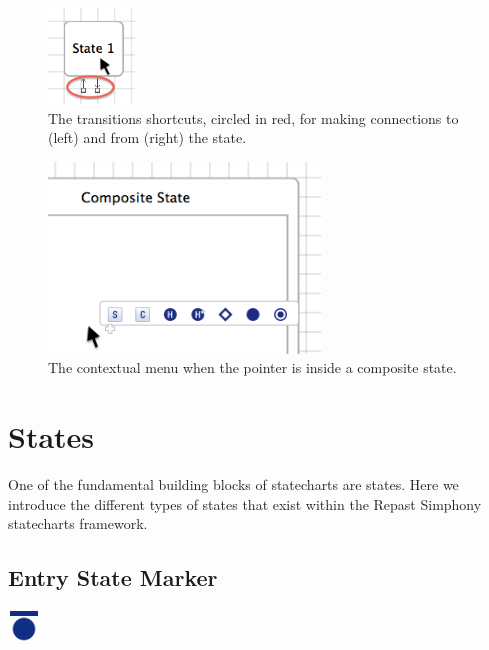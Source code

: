 \documentclass[11pt]{amsart}
\begin{document}
\begin{figure}
\begin{center}
\vspace{.2in}
\centerline {
\includegraphics[height=1in]{StatechartsImages/StateConnectorsHover.png}
}
\caption{The transitions shortcuts, circled in red, for making connections to (left) and from (right) the state.}
\label{fig:stateConnectorsHover}
\end{center}
\end{figure}
\begin{figure}
\begin{center}
\vspace{.2in}
\centerline {
\includegraphics[height=2in]{StatechartsImages/CompositeContextualMenu.png}
}
\caption{The contextual menu when the pointer is inside a composite state.}
\label{fig:compositeContextualMenu}
\end{center}

\end{figure}

\clearpage

\section{States}
\label{sec:states}
One of the fundamental building blocks of statecharts are states. Here we introduce the different types of states that exist within the Repast Simphony statecharts framework.

\subsection{Entry State Marker}
\includegraphics[height=.2in]{StatechartsImages/First-State-32.png}
\end{document}
